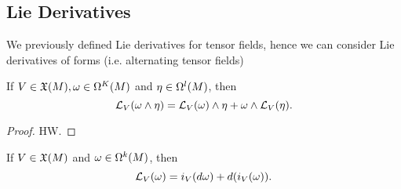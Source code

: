 \subsection{Lie Derivatives}
We previously defined Lie derivatives for tensor fields, hence we can consider Lie derivatives of forms (i.e. alternating tensor fields)
\begin{proposition}
    If $V \in \frak{X}(M), \omega \in \Omega^K(M)$ and $\eta 
    \in \Omega^l(M)$, then 
    $$\mathcal{L}_V(\omega \wedge \eta) = \mathcal{L}_V(\omega) \wedge \eta + \omega \wedge \mathcal{L}_V(\eta). $$
\end{proposition}
\begin{proof}
    HW. 
\end{proof}
\begin{theorem}\label{14.35}
    If $V \in \frak{X}(M)$ and $\omega \in \Omega^k(M)$, then 
    $$\mathcal{L}_V(\omega) = i_V(d\omega) + d(i_V(\omega)). $$
\end{theorem}
